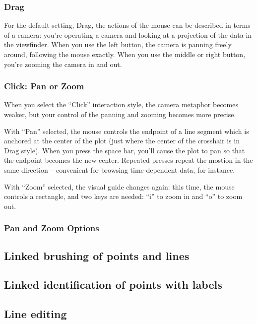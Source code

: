 \documentclass[11pt]{article}
\begin{document}
\subsubsection{Drag}

For the default setting, Drag, the actions of the mouse can be
described in terms of a camera:  you're operating a camera and
looking at a projection of the data in the viewfinder.  When you use
the left button, the camera is panning freely around, following the
mouse exactly.  When you use the middle or right button, you're
zooming the camera in and out.

\subsubsection{Click: Pan or Zoom}

When you select the ``Click'' interaction style, the camera metaphor
becomes weaker, but your control of the panning and zooming becomes
more precise.

With ``Pan'' selected, the mouse controls the endpoint of a line
segment which is anchored at the center of the plot (just where the
center of the crosshair is in Drag style).  When you press the space
bar, you'll cause the plot to pan so that the endpoint becomes the
new center.  Repeated presses repeat the mostion in the same
direction -- convenient for browsing time-dependent data, for
instance.

With ``Zoom'' selected, the visual guide changes again:  this time,
the mouse controls a rectangle, and two keys are needed:  ``i'' to
zoom in and ``o'' to zoom out.



\subsubsection{Pan and Zoom Options}

\subsection{Linked brushing of points and lines}
\label{slbl:Color}
\subsection{Linked identification of points with labels}
\subsection{Line editing}
\end{document}
